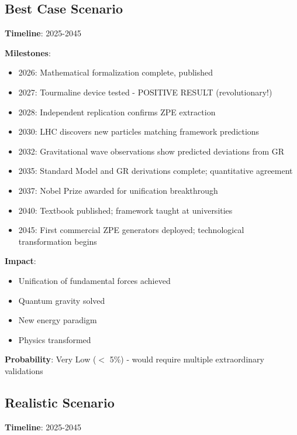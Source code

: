 \subsection{Best Case Scenario}

\textbf{Timeline}: 2025-2045

\textbf{Milestones}:
\begin{itemize}
    \item 2026: Mathematical formalization complete, published
    \item 2027: Tourmaline device tested - POSITIVE RESULT (revolutionary!)
    \item 2028: Independent replication confirms ZPE extraction
    \item 2030: LHC discovers new particles matching framework predictions
    \item 2032: Gravitational wave observations show predicted deviations from GR
    \item 2035: Standard Model and GR derivations complete; quantitative agreement
    \item 2037: Nobel Prize awarded for unification breakthrough
    \item 2040: Textbook published; framework taught at universities
    \item 2045: First commercial ZPE generators deployed; technological transformation begins
\end{itemize}

\textbf{Impact}:
\begin{itemize}
    \item Unification of fundamental forces achieved
    \item Quantum gravity solved
    \item New energy paradigm
    \item Physics transformed
\end{itemize}

\textbf{Probability}: Very Low ($<$ 5\%) - would require multiple extraordinary validations

\subsection{Realistic Scenario}

\textbf{Timeline}: 2025-2045

